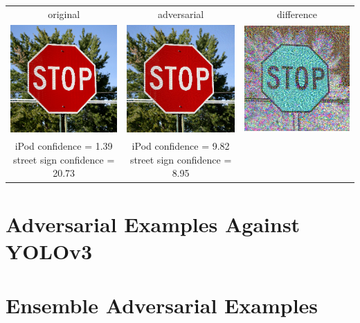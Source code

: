 \documentclass{article}
\begin{document}
\begin{center}
\begin{tabular}{ c c c }
    original & adversarial & difference \\
    \includegraphics[width=0.3\linewidth]{../test_images/stop.png} & \includegraphics[width=0.3\linewidth]{../test_images/adversarial_vgg/stop.png} & \includegraphics[width=0.3\linewidth]{../test_images/adversarial_vgg/stop_diff.png} \\
    \makecell{iPod confidence = 1.39 \\street sign confidence = 20.73} & \makecell{iPod confidence = 9.82 \\street sign confidence = 8.95} & \\
\end{tabular}
\end{center}

\section{Adversarial Examples Against YOLOv3}

\section{Ensemble Adversarial Examples}
\end{document}

